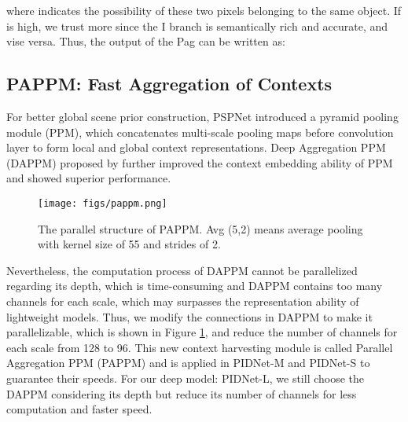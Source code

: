 \documentclass[10pt,twocolumn,letterpaper]{article}
\begin{document}
where  indicates the possibility of these two pixels belonging to the same object. If  is high, we trust  more since the I branch is semantically rich and accurate, and vise versa. Thus, the output of the Pag can be written as:



\subsection{PAPPM: Fast Aggregation of Contexts}
For better global scene prior construction, PSPNet \cite{pspnet} introduced a pyramid pooling module (PPM), which concatenates multi-scale pooling maps before convolution layer to form local and global context representations. Deep Aggregation PPM (DAPPM) proposed by \cite{ddrnet} further improved the context embedding ability of PPM and showed superior performance. 
\begin{figure}[h]
\centering
    \texttt{[image: figs/pappm.png]}
\caption{The parallel structure of PAPPM. Avg (5,2) means average pooling with kernel size of 55 and strides of 2.}
\label{fig:pappm}
\end{figure}
Nevertheless, the computation process of DAPPM cannot be parallelized regarding its depth, which is time-consuming and DAPPM contains too many channels for each scale, which may surpasses the representation ability of lightweight models. 
Thus, we modify the connections in DAPPM to make it parallelizable, which is shown in Figure \ref{fig:pappm}, and reduce the number of channels for each scale from 128 to 96. This new context harvesting module is called Parallel Aggregation PPM (PAPPM) and is applied in PIDNet-M and PIDNet-S to guarantee their speeds. For our deep model: PIDNet-L, we still choose the DAPPM considering its depth but reduce its number of channels for less computation and faster speed.
\end{document}
